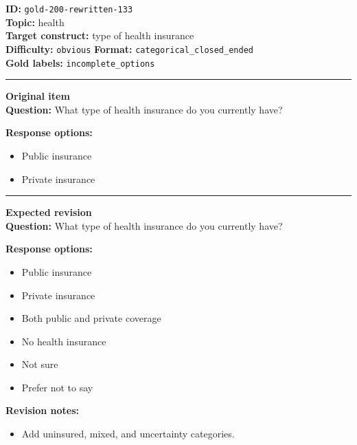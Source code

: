 \documentclass[10pt,a4paper]{article}
\newcommand{\sectionline}{\vspace{0.15em}\hrule\vspace{0.35em}}
\begin{document}
\begin{tcolorbox}[colframe=FlawRed,colback=white,colbacktitle=FlawRed!9,coltitle=black,title={Item 133\hfill Flawed item}]
\textbf{ID:} \texttt{gold-200-rewritten-133}\\
\textbf{Topic:} health\\
\textbf{Target construct:} type of health insurance\\
\textbf{Difficulty:} \texttt{obvious} \quad \textbf{Format:} \texttt{categorical\_closed\_ended}\\
\textbf{Gold labels:} \texttt{incomplete\_options}\\
\sectionline
\textbf{Original item}\\
\textbf{Question:} What type of health insurance do you currently have?
\par\textbf{Response options:}
\begin{itemize}
\item Public insurance
\item Private insurance
\end{itemize}
\sectionline
\textbf{Expected revision}\\
\textbf{Question:} What type of health insurance do you currently have?
\par\textbf{Response options:}
\begin{itemize}
\item Public insurance
\item Private insurance
\item Both public and private coverage
\item No health insurance
\item Not sure
\item Prefer not to say
\end{itemize}
\par\textbf{Revision notes:}
\begin{itemize}
\item Add uninsured, mixed, and uncertainty categories.
\end{itemize}
\end{tcolorbox}
\end{document}
